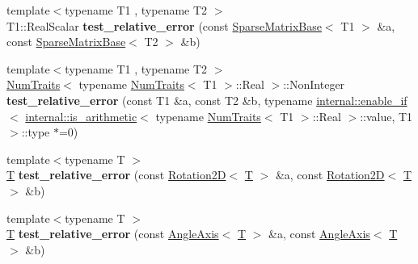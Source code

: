 \begin{DoxyCompactItemize}
{\footnotesize template$<$typename T1 , typename T2 $>$ }\\T1\+::\+Real\+Scalar {\bfseries test\+\_\+relative\+\_\+error} (const \hyperlink{group___sparse_core___module_class_eigen_1_1_sparse_matrix_base}{Sparse\+Matrix\+Base}$<$ T1 $>$ \&a, const \hyperlink{group___sparse_core___module_class_eigen_1_1_sparse_matrix_base}{Sparse\+Matrix\+Base}$<$ T2 $>$ \&b)
\item 
\mbox{\label{namespace_eigen_a8d0b7e0072746cf81dfbc81170ddba3b}} 
{\footnotesize template$<$typename T1 , typename T2 $>$ }\\\hyperlink{group___core___module_struct_eigen_1_1_num_traits}{Num\+Traits}$<$ typename \hyperlink{group___core___module_struct_eigen_1_1_num_traits}{Num\+Traits}$<$ T1 $>$\+::Real $>$\+::Non\+Integer {\bfseries test\+\_\+relative\+\_\+error} (const T1 \&a, const T2 \&b, typename \hyperlink{struct_eigen_1_1internal_1_1enable__if}{internal\+::enable\+\_\+if}$<$ \hyperlink{struct_eigen_1_1internal_1_1is__arithmetic}{internal\+::is\+\_\+arithmetic}$<$ typename \hyperlink{group___core___module_struct_eigen_1_1_num_traits}{Num\+Traits}$<$ T1 $>$\+::Real $>$\+::value, T1 $>$\+::type $\ast$=0)
\item 
\mbox{\label{namespace_eigen_ae7b119ece58adbb33db1f2670e988423}} 
{\footnotesize template$<$typename T $>$ }\\\hyperlink{group___sparse_core___module}{T} {\bfseries test\+\_\+relative\+\_\+error} (const \hyperlink{group___geometry___module_class_eigen_1_1_rotation2_d}{Rotation2D}$<$ \hyperlink{group___sparse_core___module}{T} $>$ \&a, const \hyperlink{group___geometry___module_class_eigen_1_1_rotation2_d}{Rotation2D}$<$ \hyperlink{group___sparse_core___module}{T} $>$ \&b)
\item 
\mbox{\label{namespace_eigen_ac9c97575f6fba46c2982b464c9cde90c}} 
{\footnotesize template$<$typename T $>$ }\\\hyperlink{group___sparse_core___module}{T} {\bfseries test\+\_\+relative\+\_\+error} (const \hyperlink{group___geometry___module_class_eigen_1_1_angle_axis}{Angle\+Axis}$<$ \hyperlink{group___sparse_core___module}{T} $>$ \&a, const \hyperlink{group___geometry___module_class_eigen_1_1_angle_axis}{Angle\+Axis}$<$ \hyperlink{group___sparse_core___module}{T} $>$ \&b)
\item 
\mbox{\label{namespace_eigen_a621499e5e36df27ae4c11bef1bbac48d}} 

\end{DoxyCompactItemize}
